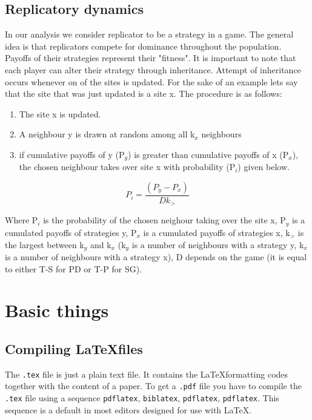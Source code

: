 \documentclass[english, twoside, 12pt, a4paper]{article}
\theoremstyle{definition}
\theoremstyle{plain}
\theoremstyle{remark}
\begin{document}
\subsection{Replicatory dynamics}

In our analysis we consider replicator to be a strategy in a game. The general idea is that replicators compete for dominance throughout the population. Payoffs of
their strategies represent their "fitness". It is important to note that each player can alter their strategy through inheritance. Attempt of inheritance occurs 
whenever on of the sites is updated. For the sake of an example lets say that the site that was just updated is a site x. The procedure is as follows:

\begin{enumerate}
  \item The site x is updated.
  \item A neighbour y is drawn at random among all k$_{x}$ neighbours
  \item if cumulative payoffs of y (P$_{y}$) is greater than cumulative payoffs of x (P$_{x}$), the chosen neighbour takes over site x with probability (P$_{i}$) given below.
\end{enumerate}


\begin{center}

\[
  P_{i} = \frac{(P_{y} - P_{x})}{Dk_{>}}
  \]
\end{center}
Where P$_{i}$ is the probability of the chosen neighour taking over the site x, P$_{y}$ is a cumulated payoffs of strategies y, P$_{x}$ is a cumulated payoffs 
of strategies x, k$_{>}$ is the largest between k$_{y}$ and k$_{x}$ (k$_{y}$ is a number of neighbours with a strategy y, k$_{x}$ is a number of neighbours with a 
strategy x), D depends on the game (it is equal to either T-S for PD or T-P for SG).\\


\clearpage
\section{Basic things}

\subsection{Compiling \LaTeX files}

The \verb+.tex+ file is just a plain text file. It contains the \LaTeX formatting codes together with the content of a paper. To get a \verb+.pdf+ file you have to compile the \verb+.tex+ file using a sequence \verb+pdflatex+, \verb+biblatex+, \verb+pdflatex+, \verb+pdflatex+. This sequence is a default in most editors designed for use with \LaTeX.
\end{document}
